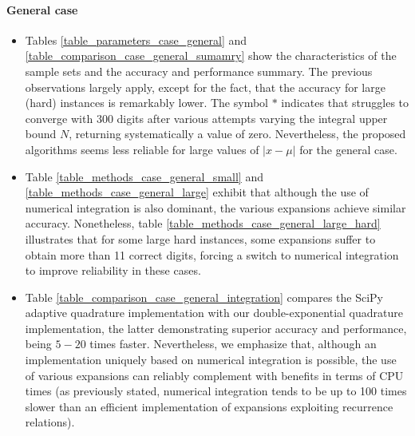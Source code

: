 \documentclass[10pt,a4paper,oneside]{article}
\numberwithin{equation}{section}
\begin{document}
\paragraph{General case}
\begin{itemize}
\item Tables \ref{table_parameters_case_general} and \ref{table_comparison_case_general_sumamry} show the characteristics of the sample sets and the accuracy and performance summary. The previous observations largely apply, except for the fact, that the accuracy for large (hard) instances is remarkably lower. The symbol $*$ indicates that struggles to converge with 300 digits after various attempts varying the integral upper bound $N$, returning systematically a value of zero. Nevertheless, the proposed algorithms seems less reliable for large values of $|x-\mu|$ for the general case.
\item Table \ref{table_methods_case_general_small} and  \ref{table_methods_case_general_large} exhibit that although the use of numerical integration is also dominant, the various expansions achieve similar accuracy. Nonetheless, table \ref{table_methods_case_general_large_hard} illustrates that for some large hard instances, some expansions suffer to obtain more than 11 correct digits, forcing a switch to numerical integration to improve reliability in these cases.
\item Table \ref{table_comparison_case_general_integration} compares the SciPy adaptive quadrature implementation with our double-exponential quadrature implementation, the latter demonstrating superior accuracy and performance, being $5-20$ times faster. Nevertheless, we emphasize that, although an implementation uniquely based on numerical integration is possible, the use of various expansions can reliably complement with benefits in terms of CPU times (as previously stated, numerical integration tends to be up to 100 times slower than an efficient implementation of expansions exploiting recurrence relations).
\end{itemize}

\end{document}
